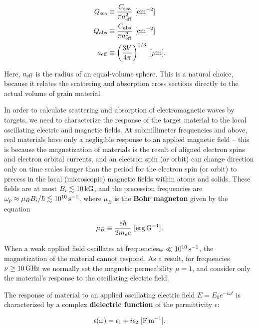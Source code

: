 \documentclass[a4paper,10pt]{article}
\begin{document}
\begin{align*}
    Q_{\rm sca} &\equiv \frac{C_{\rm sca}}{\pi a_{\rm eff}^2} ~ [{\rm cm^{-2}}] \\
    Q_{\rm abs} &\equiv \frac{C_{\rm abs}}{\pi a_{\rm eff}^2} ~ [{\rm cm^{-2}}] \\
    a_{\rm eff} &\equiv \left(\frac{3V}{4\pi}\right)^{1/3}  ~ [{\rm \mu m}].
\end{align*}

{\noindent}Here, $a_{\rm eff}$ is the radius of an equal-volume sphere. This is a natural choice, because it relates the scattering and absorption cross sections directly to the actual volume of grain material.

{\noindent}In order to calculate scattering and absorption of electromagnetic waves by targets, we need to characterize the response of the target material to the local oscillating electric and magnetic fields. At submillimeter frequencies and above, real materials have only a negligible response to an applied magnetic field -- this is because the magnetization of materials is the result of aligned electron spins and electron orbital currents, and an electron spin (or orbit) can change direction only on time scales longer than the period for the electron spin (or orbit) to precess in the local (microscopic) magnetic fields within atoms and solids. These fields are at most $B_i\lesssim10\,{\rm kG}$, and the precession frequencies are $\omega_p\approx \mu_BB_i/\hbar\lesssim10^{10}\,{\rm s^{-1}}$, where $\mu_B$ is the \textbf{Bohr magneton} given by the equation

\begin{align*}
    \mu_B \equiv \frac{e\hbar}{2m_ec} ~ [{\rm erg\,G^{-1}}].
\end{align*}

{\noindent}When a weak applied field oscillates at frequencies$\omega\ll10^{10}\,{\rm s^{-1}}$, the magnetization of the material cannot respond. As a result, for frequencies $\nu\geq10\,{\rm GHz}$ we normally set the magnetic permeability $\mu=1$, and consider only the material's response to the oscillating electric field.

{\noindent}The response of material to an applied oscillating electric field $E=E_0e^{-i\omega t}$ is characterized by a complex \textbf{dielectric function} of the permittivity $\epsilon$:

\begin{align*}
    \epsilon(\omega) = \epsilon_1 + i\epsilon_2 ~ [{\rm F\,m^{-1}}].
\end{align*}
\end{document}
